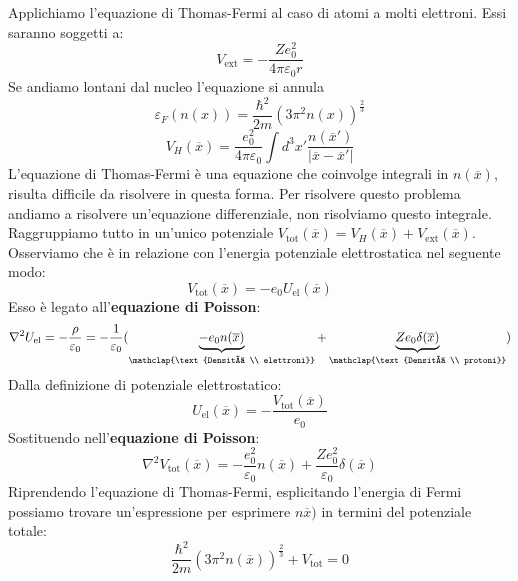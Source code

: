 Applichiamo l'equazione di Thomas-Fermi al caso di atomi a molti elettroni. Essi saranno soggetti a:
\begin{equation*}
    V_{\text{ext}}=-\frac{Ze_0^2}{4\pi\varepsilon_0 r}
\end{equation*}
Se andiamo lontani dal nucleo l'equazione si annula 
\begin{equation*}
    \varepsilon_F(n(x))=\frac{\hbar^2}{2m}(3\pi^2n(x))^{\frac 23}
\end{equation*}
\begin{equation*}
    V_H(\overline x)=\frac{e_0^2}{4\pi\varepsilon_0}\int d^3x'\frac{n(\overline{x}')}{|\overline x - \overline{x}'|}
\end{equation*}
L'equazione di Thomas-Fermi è una equazione che coinvolge integrali in $n(\overline x)$, risulta difficile da risolvere in questa forma. Per risolvere questo problema andiamo a risolvere un'equazione differenziale, non risolviamo questo integrale.\\
Raggruppiamo tutto in un'unico potenziale $V_\text{tot}(\overline x)=V_H(\overline x)+V_{\text{ext}}(\overline x)$. Osserviamo che è in relazione con l'energia potenziale elettrostatica nel seguente modo:
\begin{equation*}
    V_\text{tot}(\overline x)=-e_0U_\text{el}(\overline x)
\end{equation*}
Esso è legato all'\textbf{equazione di Poisson}:
\begin{equation*}
    \nabla^2U_\text{el}=-\frac{\rho}{\varepsilon_0}=-\frac 1 {\varepsilon_0}(\underbrace{-e_0n(\overline x)}_{\mathclap{\text{Densità \\ elettroni}}}+\underbrace{Ze_0\delta(\overline x)}_{\mathclap{\text{Densità \\ protoni}}})
\end{equation*}
Dalla definizione di potenziale elettrostatico:
\begin{equation*}
    U_\text{el}(\overline x)=-\frac{V_\text{tot}(\overline x)}{e_0}
\end{equation*}
Sostituendo nell'\textbf{equazione di Poisson}:
\begin{equation*}
    \nabla^2V_\text{tot}(\overline x)=-\frac{e_0^2}{\varepsilon_0}n(\overline x)+\frac{Ze_0^2}{\varepsilon_0}\delta(\overline x)
\end{equation*}
Riprendendo l'equazione di Thomas-Fermi, esplicitando l'energia di Fermi possiamo trovare un'espressione per esprimere $n\overline x)$ in termini del potenziale totale:
\begin{equation*}
    \frac{\hbar^2}{2m}(3\pi^2n(\overline x))^{\frac 23}+V_{\text{tot}}=0
\end{equation*}
